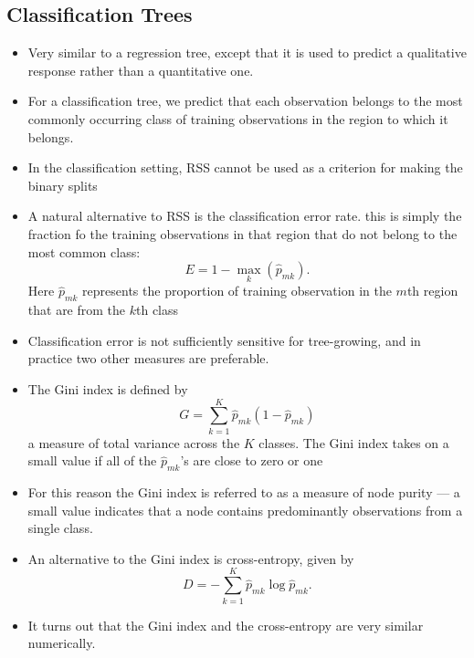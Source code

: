 \documentclass[11pt, a4paper]{article}
\begin{document}
\subsection{Classification Trees}
\begin{itemize}
  \item Very similar to a regression tree, except that it is used to predict a qualitative response rather than a quantitative one.
  \item For a classification tree, we predict that each observation belongs to the most commonly occurring class of training observations in the region to which it belongs.
  \item In the classification setting, RSS cannot be used as a criterion for making the binary splits
  \item A natural alternative to RSS is the classification error rate. this is simply the fraction fo the training observations in that region that do not belong to the most common class:
\[
  E=1-\max_k(\hat{p}_{mk}).
\]
Here $\hat{p}_{mk}$ represents the proportion of training observation in the $m$th region that are from the $k$th class
\item Classification error is not sufficiently sensitive for tree-growing, and in practice two other measures are preferable.
\item The Gini index is defined by
\[
  G=\sum_{k=1}^K\hat{p}_{mk}(1-\hat{p}_{mk})  
\]
a measure of total variance across the $K$ classes. The Gini index takes on a small value if all of the $\hat{p}_{mk}$'s are close to zero or one
\item For this reason the Gini index is referred to as a measure of node purity --- a small value indicates that a node contains predominantly observations from a single class.
\item An alternative to the Gini index is cross-entropy, given by 
  \[
    D=-\sum_{k=1}^K\hat{p}_{mk}\log\hat{p}_{mk}.
  \]
\item It turns out that the Gini index and the cross-entropy are very similar numerically.
\end{itemize}
\end{document}
